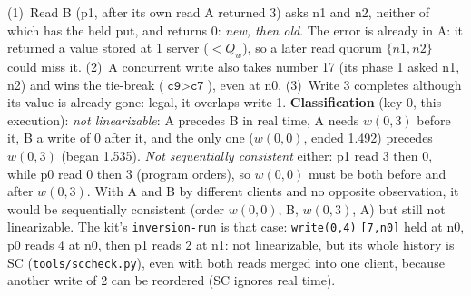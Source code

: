 \documentclass[a4paper,10pt]{article}
\begin{document}
\begin{center}
\end{center}
\vspace{-0.6em}
{\small (1)~Read B (p1, after its own read A returned 3) asks n1 and n2,
neither of which has the held put, and returns 0: \emph{new, then old}.
The error is already in A: it returned a value stored at 1 server
($<Q_w$), so a later read quorum $\{n1,n2\}$ could miss it. (2)~A
concurrent write also takes number 17 (its phase 1 asked n1, n2) and wins
the tie-break ($\texttt{c9}>\texttt{c7}$), even at n0. (3)~Write 3 completes
although its value is already gone: legal, it overlaps write 1.
\textbf{Classification} (key 0, this execution): \emph{not linearizable}: A
precedes B in real time, A needs $w(0,3)$ before it, B a write of 0 after
it, and the only one ($w(0,0)$, ended 1.492) precedes $w(0,3)$ (began
1.535). \emph{Not sequentially consistent} either: p1 read 3 then 0, while
p0 read 0 then 3 (program orders), so $w(0,0)$ must be both before and
after $w(0,3)$. With A and B by different clients and no opposite
observation, it would be sequentially consistent (order $w(0,0)$, B,
$w(0,3)$, A) but still not linearizable. The kit's \texttt{inversion-run}
is that case: \texttt{write(0,4)} \texttt{[7,n0]} held at n0, p0 reads 4 at
n0, then p1 reads 2 at n1: not linearizable, but its whole history is SC
(\texttt{tools/sccheck.py}), even with both reads merged into one client,
because another write of 2 can be reordered (SC ignores real time).}
\end{document}
